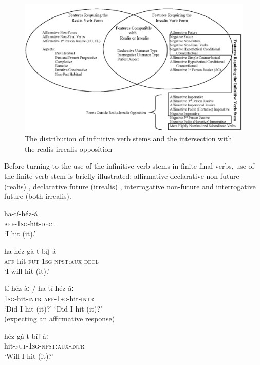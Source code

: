 \documentclass[output=paper]{langsci/langscibook}
\begin{document}
\begin{figure}
\includegraphics[width=\textwidth]{figures/MAhlandFig2.png}
\caption{The distribution of infinitive verb stems and the intersection with the realis-irrealis opposition}
\label{fig:2}
\end{figure}


Before turning to the use of the infinitive verb stems in finite final verbs, use of the finite verb stem is briefly illustrated: affirmative declarative non-future (realis) , declarative future (irrealis) , interrogative non-future  and interrogative future  (both irrealis).

\ea\label{ex:mahland:52}
\gll ha-tí-héz-{\downstep}á\\
\textsc{aff-1sg}{}-hit-\textsc{decl} \\
\glt `I hit (it).'
\z

\ea\label{ex:mahland:53}
\gll ha-héz-gà-t-bíʃ-á\\
\textsc{aff}{}-hit-\textsc{fut-1sg-npst:aux-decl} \\
\glt `I will hit (it).'
\z

\ea\label{ex:mahland:54}
\gll tí-héz-àː       /    ha-tí-héz-\^{a}ː\\
\textsc{1sg}{}-hit-\textsc{intr}     \textsc{aff-1sg}{}-hit-\textsc{intr}\\
\glt `Did I hit (it)?'      `Did I hit (it)?' \\
(expecting an affirmative response)
\z

\ea\label{ex:mahland:55}
\gll héz-gà-t-bíʃ-àː\\
hit-\textsc{fut-1sg-npst:aux-intr}\\
\glt `Will I hit (it)?'
\z
\end{document}
